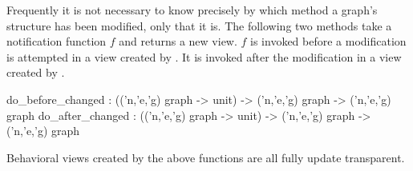Frequently it is not necessary to know precisely by which method a graph's
structure has been modified, only that it is.  The following two methods
take a notification function $f$ and returns a new view.  $f$ is
invoked before a modification is attempted in a view created
by .  It is invoked after the modification in
a view created by .
\begin{SML}
   do_before_changed : (('n,'e,'g) graph -> unit) -> ('n,'e,'g) graph -> ('n,'e,'g) graph
   do_after_changed : (('n,'e,'g) graph -> unit) -> ('n,'e,'g) graph -> ('n,'e,'g) graph
\end{SML}

Behavioral views created by the above functions are all fully update
transparent.
